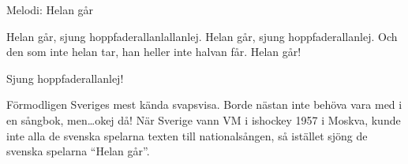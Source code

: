 \begin{song}

\begin{songmeta}
Melodi: Helan går
\end{songmeta}

\begin{songtext}
Helan går, sjung hoppfaderallanlallanlej.
Helan går, sjung hoppfaderallanlej.
Och den som inte helan tar,
han heller inte halvan får.
Helan går!

Sjung hoppfaderallanlej!
\end{songtext}

\begin{songnotes}
Förmodligen Sveriges mest kända svapsvisa. Borde nästan inte behöva vara med i en sångbok, men\ldots okej då!
När Sverige vann VM i ishockey 1957 i Moskva, kunde inte alla de svenska spelarna texten till nationalsången, så istället sjöng de svenska spelarna \textquotedblleft{}Helan går\textquotedblright{}.
\end{songnotes}
\end{song}
